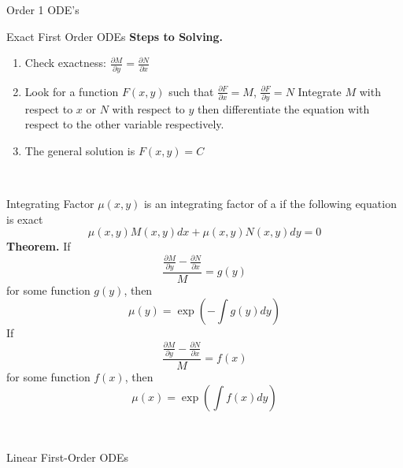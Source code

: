 \documentclass{article}
\begin{document}
\begin{multicols*}{3}
\begin{blackbox}{Order 1 ODE's}
{\begin{bluebox}{Exact First Order ODEs}
            \textbf{Steps to Solving.}
                \begin{enumerate}[leftmargin=7pt]
                    \item Check exactness: $\frac{\partial M}{\partial y} = \frac{\partial N}{\partial x}$
                    \item Look for a function $F(x,y)$ such that $\frac{\partial F}{\partial x} = M$, $\frac{\partial F}{\partial y} = N$
                    Integrate $M$ with respect to $x$ or $N$ with respect to $y$ then differentiate the equation with respect to the other variable respectively.
                    \item The general solution is $F(x,y) = C$
                \end{enumerate}
        \end{bluebox}\\[-2ex]
        \begin{brownbox}{Integrating Factor}
            $\mu(x,y)$ is an integrating factor of a if the following equation is exact \\[-2ex]
            \[\mu(x,y)M(x,y)dx + \mu(x,y)N(x,y)dy = 0\]
            \textbf{Theorem.}
                If \\[-5ex]
                \[\frac{\frac{\partial M}{\partial y} - \frac{\partial N}{\partial x}}{M} = g(y)\]
                for some function $g(y)$, then\\[-2ex]
                \[\mu(y) = \exp\left(-\int g(y) dy\right)\]
                If \\[-5ex]
                \[\frac{\frac{\partial M}{\partial y} - \frac{\partial N}{\partial x}}{M} = f(x)\]
                for some function $f(x)$, then\\[-2ex]
                \[\mu(x) = \exp\left(\int f(x) dy\right)\]
        \end{brownbox}\\[-2ex]
        }
\end{blackbox}
        

\begin{blackbox}{Linear First-Order ODEs}
    {\footnotesize

}
\end{blackbox}
\end{multicols*}
\end{document}
